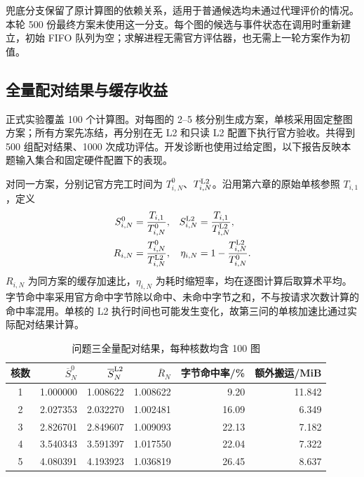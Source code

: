 兜底分支保留了原计算图的依赖关系，适用于普通候选均未通过代理评价的情况。本轮 500 份最终方案未使用这一分支。每个图的候选与事件状态在调用时重新建立，初始 FIFO 队列为空；求解进程无需官方评估器，也无需上一轮方案作为初值。

\subsection{全量配对结果与缓存收益}
正式实验覆盖 100 个计算图。对每图的 2--5 核分别生成方案，单核采用固定整图方案；所有方案先冻结，再分别在无 L2 和只读 L2 配置下执行官方验收。共得到 500 组配对结果、1000 次成功评估。开发诊断也使用过给定图，以下报告反映本题输入集合和固定硬件配置下的表现。

对同一方案，分别记官方完工时间为 $T^0_{i,N}$、$T^{\rm L2}_{i,N}$。沿用第六章的原始单核参照 $T_{i,1}$，定义
\begin{equation}
\begin{aligned}
S^0_{i,N}&=\frac{T_{i,1}}{T^0_{i,N}},&
S^{\rm L2}_{i,N}&=\frac{T_{i,1}}{T^{\rm L2}_{i,N}},\\
R_{i,N}&=\frac{T^0_{i,N}}{T^{\rm L2}_{i,N}},&
\eta_{i,N}&=1-\frac{T^{\rm L2}_{i,N}}{T^0_{i,N}}.
\end{aligned}
\label{eq:q3-metrics}
\end{equation}
$R_{i,N}$ 为同方案的缓存加速比，$\eta_{i,N}$ 为耗时缩短率，均在逐图计算后取算术平均。字节命中率采用官方命中字节除以命中、未命中字节之和，不与按请求次数计算的命中率混用。单核的 L2 执行时间也可能发生变化，故第三问的单核加速比通过实际配对结果计算。

\begin{table}[htbp]
\centering
\caption{问题三全量配对结果，每种核数均含 100 图}
\label{tab:q3-results}
\begin{tabular}{crrrrr}
\hline
核数 & $\overline S^0_N$ & $\overline S^{\rm L2}_N$ & $\overline R_N$ & 字节命中率/\% & 额外搬运/MiB \\
\hline
1 & 1.000000 & 1.008622 & 1.008622 & 9.20 & 11.842 \\
2 & 2.027353 & 2.032270 & 1.002481 & 16.09 & 6.349 \\
3 & 2.826701 & 2.849607 & 1.009093 & 22.13 & 7.182 \\
4 & 3.540343 & 3.591397 & 1.017550 & 22.04 & 7.322 \\
5 & 4.080391 & 4.193923 & 1.036819 & 26.45 & 8.637 \\
\hline
\end{tabular}
\end{table}


